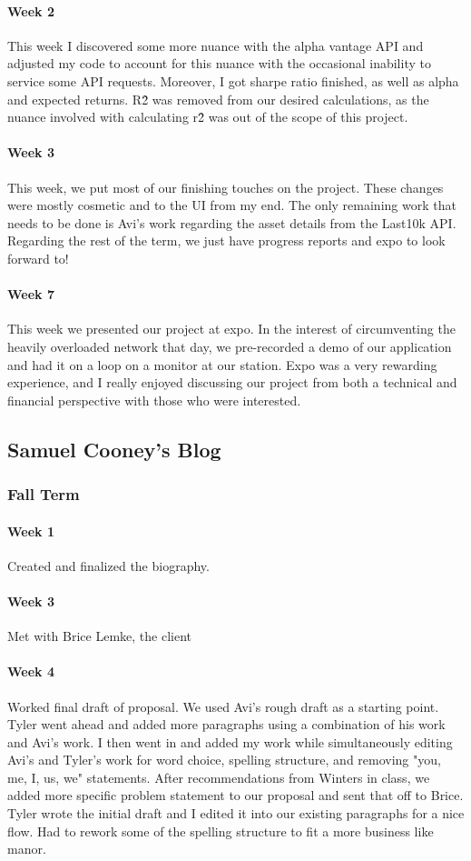 \documentclass[onecolumn, draftclsnofoot,10pt, compsoc]{IEEEtran}
\begin{document}
\paragraph{Week 2}
This week I discovered some more nuance with the alpha vantage API and adjusted my code to account for this nuance with the occasional inability to service some API requests. Moreover, I got sharpe ratio finished, as well as alpha and expected returns. R\^2 was removed from our desired calculations, as the nuance involved with calculating r\^2 was out of the scope of this project.
\paragraph{Week 3}
This week, we put most of our finishing touches on the project. These changes were mostly cosmetic and to the UI from my end. The only remaining work that needs to be done is Avi's work regarding the asset details from the Last10k API. Regarding the rest of the term, we just have progress reports and expo to look forward to!
\paragraph{Week 7}
This week we presented our project at expo. In the interest of circumventing the heavily overloaded network that day, we pre-recorded a demo of our application and had it on a loop on a monitor at our station. Expo was a very rewarding experience, and I really enjoyed discussing our project from both a technical and financial perspective with those who were interested.


\subsection{Samuel Cooney's Blog}
\subsubsection{Fall Term}
\paragraph{Week 1}
Created and finalized the biography.
\paragraph{Week 3}
Met with Brice Lemke, the client
\paragraph{Week 4}
Worked final draft of proposal. We used Avi's rough draft as a starting point. Tyler went ahead and added more paragraphs using a combination of his work and Avi's work. I then went in and added my work while simultaneously editing Avi's and Tyler's work for word choice, spelling structure, and removing "you, me, I, us, we" statements. After recommendations from Winters in class, we added more specific problem statement to our proposal and sent that off to Brice. Tyler wrote the initial draft and I edited it into our existing paragraphs for a nice flow. Had to rework some of the spelling structure to fit a more business like manor.  
\end{document}
